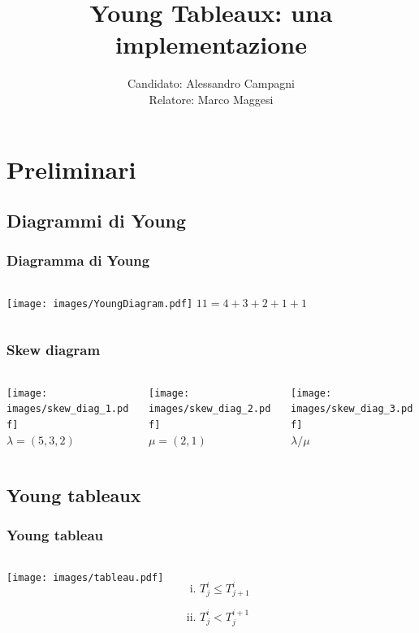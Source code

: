 \documentclass{beamer}
\title{Young Tableaux: una implementazione}
\author[Campagni]{Candidato: Alessandro Campagni \medskip \\Relatore:
  Marco Maggesi}
\date{}
\begin{document}
\begin{frame}
\titlepage
\end{frame}


\section{Preliminari}
\subsection{Diagrammi di Young}

\begin{frame}
\frametitle{Diagramma di Young}
\begin{columns}[T]
\column{5cm}
\texttt{[image: images/YoungDiagram.pdf]}
\column{5cm}
$11=4+3+2+1+1$
\end{columns}
\end{frame}


\begin{frame}
\frametitle{Skew diagram}
\centering
\begin{columns}
\begin{column}{3.3cm}
\texttt{[image: images/skew\_diag\_1.pdf]}\\
$\lambda=(5,3,2)$
\end{column}
\begin{column}{3.3cm}
\texttt{[image: images/skew\_diag\_2.pdf]}\\
$\mu=(2,1)$
\end{column}
\begin{column}{3.3cm}
\texttt{[image: images/skew\_diag\_3.pdf]}\\
$\lambda / \mu$
\end{column}
\end{columns}
\end{frame}

\subsection{Young tableaux}

\begin{frame}
\frametitle{Young tableau}
\begin{columns}
\column{5cm}
\texttt{[image: images/tableau.pdf]}
\column{5cm}
\begin{enumerate}[(i)]
\item $T^i_j \leq T^i_{j+1}$
\item $T^i_j < T^{i+1}_j$
\end{enumerate}
\end{columns}
\end{frame}
\end{document}
